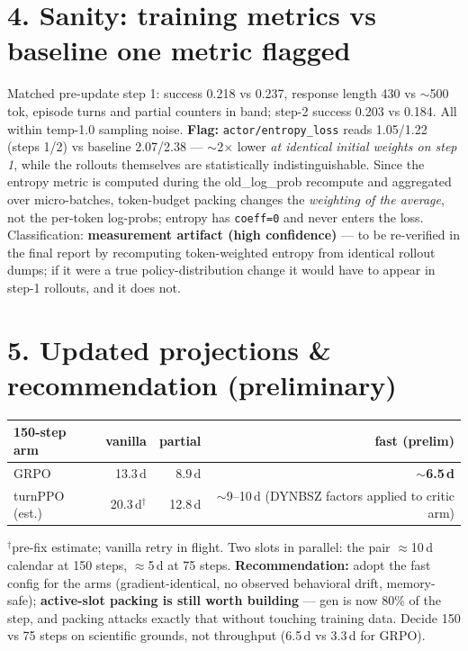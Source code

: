 \documentclass[10pt]{article}
\newcommand{\code}[1]{\texttt{\small #1}}
\newcommand{\flag}[1]{\textcolor{red!70!black}{\textbf{#1}}}
\begin{document}
\section*{4. Sanity: training metrics vs baseline \hfill \flag{one metric flagged}}
Matched pre-update step 1: success 0.218 vs 0.237, response length 430 vs $\sim$500 tok,
episode turns and partial counters in band; step-2 success 0.203 vs 0.184. All within
temp-1.0 sampling noise. \flag{Flag:} \code{actor/entropy\_loss} reads 1.05/1.22 (steps 1/2)
vs baseline 2.07/2.38 --- $\sim$2$\times$ lower \emph{at identical initial weights on step 1},
while the rollouts themselves are statistically indistinguishable. Since the entropy metric is
computed during the old\_log\_prob recompute and aggregated over micro-batches, token-budget
packing changes the \emph{weighting of the average}, not the per-token log-probs; entropy has
\code{coeff=0} and never enters the loss. Classification: \textbf{measurement artifact
(high confidence)} --- to be re-verified in the final report by recomputing token-weighted
entropy from identical rollout dumps; if it were a true policy-distribution change it would
have to appear in step-1 rollouts, and it does not.

\section*{5. Updated projections \& recommendation (preliminary)}
\small
\begin{tabular}{lrrr}
\toprule
150-step arm & vanilla & partial & \textbf{fast (prelim)}\\
\midrule
GRPO & 13.3\,d & 8.9\,d & \textbf{$\sim$6.5\,d}\\
turnPPO (est.) & 20.3\,d$^\dagger$ & 12.8\,d & $\sim$9--10\,d (DYNBSZ factors applied to critic arm)\\
\bottomrule
\end{tabular}
\normalsize

\noindent$^\dagger$pre-fix estimate; vanilla retry in flight. Two slots in parallel: the pair
$\approx$10\,d calendar at 150 steps, $\approx$5\,d at 75 steps.
\textbf{Recommendation:} adopt the fast config for the arms (gradient-identical, no observed
behavioral drift, memory-safe); \textbf{active-slot packing is still worth building} --- gen is
now 80\% of the step, and packing attacks exactly that without touching training data. Decide
150 vs 75 steps on scientific grounds, not throughput (6.5\,d vs 3.3\,d for GRPO).
\end{document}

